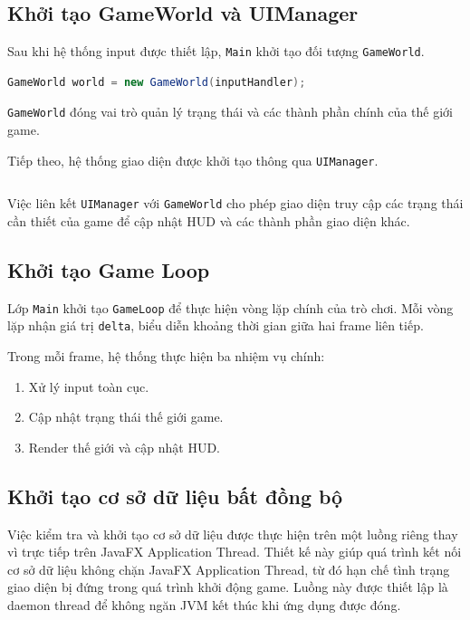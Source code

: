 \documentclass[12pt,a4paper]{report}
\begin{document}
    \subsection{Khởi tạo GameWorld và UIManager}

    Sau khi hệ thống input được thiết lập, \texttt{Main} khởi tạo
    đối tượng \texttt{GameWorld}.

    \begin{lstlisting}[language=Java]
GameWorld world = new GameWorld(inputHandler);
    \end{lstlisting}

    \texttt{GameWorld} đóng vai trò quản lý trạng thái và các thành
    phần chính của thế giới game.

    Tiếp theo, hệ thống giao diện được khởi tạo thông qua
    \texttt{UIManager}.

    \begin{lstlisting}[language=Java]
    \end{lstlisting}

    Việc liên kết \texttt{UIManager} với \texttt{GameWorld} cho phép
    giao diện truy cập các trạng thái cần thiết của game để cập nhật
    HUD và các thành phần giao diện khác.

    \subsection{Khởi tạo Game Loop}

    Lớp \texttt{Main} khởi tạo \texttt{GameLoop} để thực hiện vòng
    lặp chính của trò chơi. Mỗi vòng lặp nhận giá trị
    \texttt{delta}, biểu diễn khoảng thời gian giữa hai frame liên tiếp.

    Trong mỗi frame, hệ thống thực hiện ba nhiệm vụ chính:

    \begin{enumerate}
        \item Xử lý input toàn cục.
        \item Cập nhật trạng thái thế giới game.
        \item Render thế giới và cập nhật HUD.
    \end{enumerate}

    \subsection{Khởi tạo cơ sở dữ liệu bất đồng bộ}

    Việc kiểm tra và khởi tạo cơ sở dữ liệu được thực hiện trên một
    luồng riêng thay vì trực tiếp trên JavaFX Application Thread.
    Thiết kế này giúp quá trình kết nối cơ sở dữ liệu không chặn
    JavaFX Application Thread, từ đó hạn chế tình trạng giao diện
    bị đứng trong quá trình khởi động game.
    Luồng này được thiết lập là daemon thread để không ngăn JVM
    kết thúc khi ứng dụng được đóng.
\end{document}
